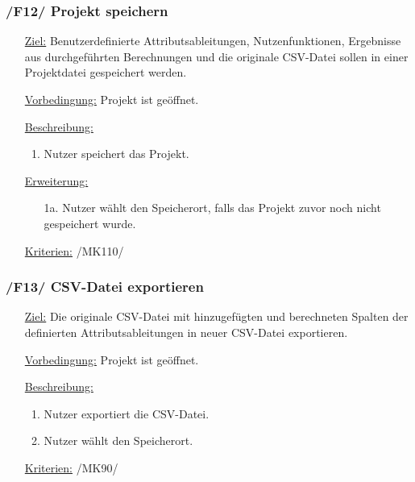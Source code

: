 \documentclass{article}
\begin{document}
\subsubsection*{/F12/ Projekt speichern}
\begin{itemize}
    \item[\underline{Ziel:}] Benutzerdefinierte Attributsableitungen, Nutzenfunktionen, Ergebnisse aus durchgeführten Berechnungen und die originale CSV-Datei sollen in einer Projektdatei gespeichert werden.
    \item[\underline{Vorbedingung:}] Projekt ist geöffnet.
    \item[\underline{Beschreibung:}] 
    \begin{enumerate}
        \item Nutzer speichert das Projekt.
    \end{enumerate}
    \item[\underline{Erweiterung:}]
    \begin{itemize}
        \item[1a.] Nutzer wählt den Speicherort, falls das Projekt zuvor noch nicht gespeichert wurde.
    \end{itemize}
    \item[\underline{Kriterien:}] /MK110/
\end{itemize}

\subsubsection*{/F13/ CSV-Datei exportieren}
\begin{itemize}
    \item[\underline{Ziel:}] Die originale CSV-Datei mit hinzugefügten und berechneten Spalten der definierten Attributsableitungen in neuer CSV-Datei exportieren.
    \item[\underline{Vorbedingung:}] Projekt ist geöffnet.
    \item[\underline{Beschreibung:}] 
    \begin{enumerate}
        \item Nutzer exportiert die CSV-Datei.
        \item Nutzer wählt den Speicherort.
    \end{enumerate}
    \item[\underline{Kriterien:}] /MK90/
\end{itemize}
\end{document}
